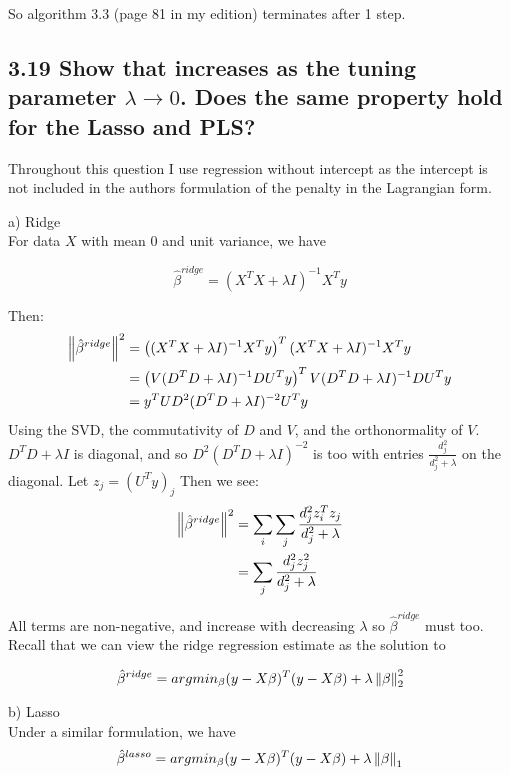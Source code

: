 So algorithm 3.3 (page 81 in my edition) terminates after 1 step.






\subsection*{3.19 Show that  increases as the tuning parameter $\lambda \rightarrow 0$. Does the same property hold for the Lasso and PLS?}

Throughout this question I use regression without intercept as the intercept is not included in the authors formulation of the penalty in the Lagrangian form.

a) Ridge\\
For data $X$ with mean 0 and unit variance, we have

$$\hat{\beta}^{ridge} = (X^TX + \lambda I)^{-1}X^T y$$

Then:
\begin{align*}
     \left\lVert\hat{\beta}^{ridge}\right\rVert^2 &= \left((X^TX + \lambda I)^{-1}X^T y\right)^T (X^TX + \lambda I)^{-1}X^T y \\
     &= \left(V (D^TD + \lambda I)^{-1}D U^T y\right)^T V(D^T D + \lambda I)^{-1} D U^T y \\
     &= y^T U D^2 (D^T D + \lambda I)^{-2} U^T y
\end{align*}
Using the SVD, the commutativity of $D$ and $V$, and the orthonormality of $V$.
$D^T D + \lambda I$ is diagonal, and so $D^2 (D^T D + \lambda I)^{-2}$ is too with entries $\frac{d_j^2}{d_j^2 + \lambda}$ on the diagonal.
Let $z_j = (U^T y)_j$
Then we see:
\begin{align*}
\left\lVert\hat{\beta}^{ridge}\right\rVert^2 &= \sum_i \sum_j \frac{d_j^2 z_i^T z_j}{d_j^2 + \lambda}\\
&= \sum_j \frac{d_j^2 z_j^2}{d_j^2 + \lambda}\\
\end{align*} 

All terms are non-negative, and increase with decreasing $\lambda$ so $\hat{\beta}^{ridge}$ must too.
Recall that we can view the ridge regression estimate as the solution to

$$\hat{\beta}^{ridge} = argmin_\beta (y - X\beta)^T (y - X \beta) + \lambda \left\lVert\beta\right\rVert_2^2$$

b) Lasso\\

Under a similar formulation, we have 
$$\hat{\beta}^{lasso} = argmin_\beta (y - X\beta)^T (y - X \beta) + \lambda \left\lVert\beta\right\rVert_1$$

